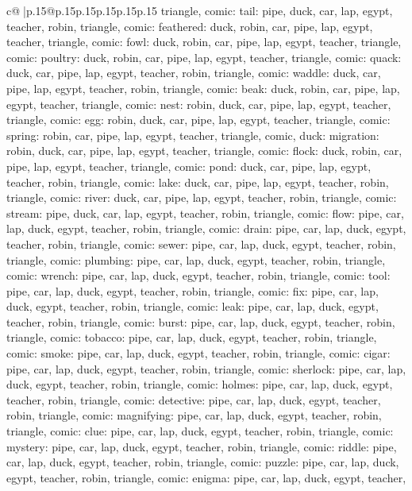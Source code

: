 \documentclass{article}
\begin{document}
{\begin{supertabular}{c@{$\;$}|p{.15\linewidth}@{}p{.15\linewidth}p{.15\linewidth}p{.15\linewidth}p{.15\linewidth}p{.15\linewidth}}
{{{triangle, comic\n\nCLUE: tail\nTARGETS: pipe, duck, car, lap, egypt, teacher, robin, triangle, comic\n\nCLUE: feathered\nTARGETS: duck, robin, car, pipe, lap, egypt, teacher, triangle, comic\n\nCLUE: fowl\nTARGETS: duck, robin, car, pipe, lap, egypt, teacher, triangle, comic\n\nCLUE: poultry\nTARGETS: duck, robin, car, pipe, lap, egypt, teacher, triangle, comic\n\nCLUE: quack\nTARGETS: duck, car, pipe, lap, egypt, teacher, robin, triangle, comic\n\nCLUE: waddle\nTARGETS: duck, car, pipe, lap, egypt, teacher, robin, triangle, comic\n\nCLUE: beak\nTARGETS: duck, robin, car, pipe, lap, egypt, teacher, triangle, comic\n\nCLUE: nest\nTARGETS: robin, duck, car, pipe, lap, egypt, teacher, triangle, comic\n\nCLUE: egg\nTARGETS: robin, duck, car, pipe, lap, egypt, teacher, triangle, comic\n\nCLUE: spring\nTARGETS: robin, car, pipe, lap, egypt, teacher, triangle, comic, duck\n\nCLUE: migration\nTARGETS: robin, duck, car, pipe, lap, egypt, teacher, triangle, comic\n\nCLUE: flock\nTARGETS: duck, robin, car, pipe, lap, egypt, teacher, triangle, comic\n\nCLUE: pond\nTARGETS: duck, car, pipe, lap, egypt, teacher, robin, triangle, comic\n\nCLUE: lake\nTARGETS: duck, car, pipe, lap, egypt, teacher, robin, triangle, comic\n\nCLUE: river\nTARGETS: duck, car, pipe, lap, egypt, teacher, robin, triangle, comic\n\nCLUE: stream\nTARGETS: pipe, duck, car, lap, egypt, teacher, robin, triangle, comic\n\nCLUE: flow\nTARGETS: pipe, car, lap, duck, egypt, teacher, robin, triangle, comic\n\nCLUE: drain\nTARGETS: pipe, car, lap, duck, egypt, teacher, robin, triangle, comic\n\nCLUE: sewer\nTARGETS: pipe, car, lap, duck, egypt, teacher, robin, triangle, comic\n\nCLUE: plumbing\nTARGETS: pipe, car, lap, duck, egypt, teacher, robin, triangle, comic\n\nCLUE: wrench\nTARGETS: pipe, car, lap, duck, egypt, teacher, robin, triangle, comic\n\nCLUE: tool\nTARGETS: pipe, car, lap, duck, egypt, teacher, robin, triangle, comic\n\nCLUE: fix\nTARGETS: pipe, car, lap, duck, egypt, teacher, robin, triangle, comic\n\nCLUE: leak\nTARGETS: pipe, car, lap, duck, egypt, teacher, robin, triangle, comic\n\nCLUE: burst\nTARGETS: pipe, car, lap, duck, egypt, teacher, robin, triangle, comic\n\nCLUE: tobacco\nTARGETS: pipe, car, lap, duck, egypt, teacher, robin, triangle, comic\n\nCLUE: smoke\nTARGETS: pipe, car, lap, duck, egypt, teacher, robin, triangle, comic\n\nCLUE: cigar\nTARGETS: pipe, car, lap, duck, egypt, teacher, robin, triangle, comic\n\nCLUE: sherlock\nTARGETS: pipe, car, lap, duck, egypt, teacher, robin, triangle, comic\n\nCLUE: holmes\nTARGETS: pipe, car, lap, duck, egypt, teacher, robin, triangle, comic\n\nCLUE: detective\nTARGETS: pipe, car, lap, duck, egypt, teacher, robin, triangle, comic\n\nCLUE: magnifying\nTARGETS: pipe, car, lap, duck, egypt, teacher, robin, triangle, comic\n\nCLUE: clue\nTARGETS: pipe, car, lap, duck, egypt, teacher, robin, triangle, comic\n\nCLUE: mystery\nTARGETS: pipe, car, lap, duck, egypt, teacher, robin, triangle, comic\n\nCLUE: riddle\nTARGETS: pipe, car, lap, duck, egypt, teacher, robin, triangle, comic\n\nCLUE: puzzle\nTARGETS: pipe, car, lap, duck, egypt, teacher, robin, triangle, comic\n\nCLUE: enigma\nTARGETS: pipe, car, lap, duck, egypt, teacher, }}}
\end{supertabular}}
\end{document}
